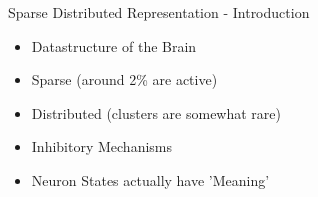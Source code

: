 \begin{frame}[c]{Sparse Distributed Representation - Introduction}
    \Large
    \begin{itemize}[<+(1)->]
        \item Datastructure of the Brain
        \item Sparse (around 2\% are active)
        \item Distributed (clusters are somewhat rare)
        \item Inhibitory Mechanisms
        \item Neuron States actually have 'Meaning'
    \end{itemize}
\end{frame}










